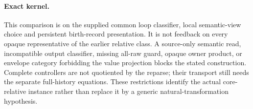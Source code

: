 \documentclass[11pt]{article}
\begin{document}
\paragraph{Exact kernel.}
This comparison is on the supplied common loop classifier, local semantic-view choice and persistent birth-record presentation. It is not feedback on every opaque representative of the earlier relative class. A source-only semantic read, incompatible output classifier, missing all-raw guard, opaque owner product, or envelope category forbidding the value projection blocks the stated construction. Complete controllers are not quotiented by the reparse; their transport still needs the separate full-history equations. These restrictions identify the actual core-relative instance rather than replace it by a generic natural-transformation hypothesis.
\end{document}
